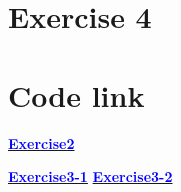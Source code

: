\documentclass[aps,12pt,prd,nofootinbib,bibnotes, amsmath,amssymb,showpacs,superscriptaddress,floatfix]{revtex4-2}
\begin{document}
\section{Exercise 4}




\section{Code link}
\href{https://github.com/kuo1235/Computational-Astrophysics-2022/tree/main/astr660/Homework/HW5/EX2/fvm}{\textcolor{blue}{\bf{Exercise2}}} 

\href{https://github.com/kuo1235/Computational-Astrophysics-2022/tree/main/astr660/Homework/HW5/EX3/fvm}{\textcolor{blue}{\bf{Exercise3-1}}}
\href{https://github.com/kuo1235/Computational-Astrophysics-2022/tree/main/astr660/Homework/HW5/EX3/fvm2d}{\textcolor{blue}{\bf{Exercise3-2}}}\\


\end{document}
